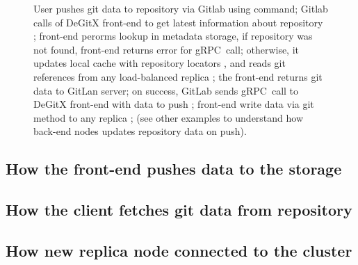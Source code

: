 \begin{figure}
{
  }
\caption{%
  User pushes git data to repository  via Gitlab using  command;%
  Gitlab calls  of DeGitX front-end to get latest information%
  about repository ; front-end perorms lookup in metadata storage,%
  if repository was not found, front-end returns error for gRPC~call;%
  otherwise, it updates local cache with repository locators , and reads git references from%
  any load-balanced replica ; the front-end returns git data to GitLan server;%
  on success, GitLab sends  gRPC~call to DeGitX front-end with data to push ;%
  front-end write data via  git method to any replica ;%
  (see other examples to understand how back-end nodes updates repository data on push).%
}\label{fig:gitlab-push-gitaly}
\end{figure}

\subsection{How the front-end pushes data to the storage}


\subsection{How the client fetches git data from repository}

\subsection{How new replica node connected to the cluster}

